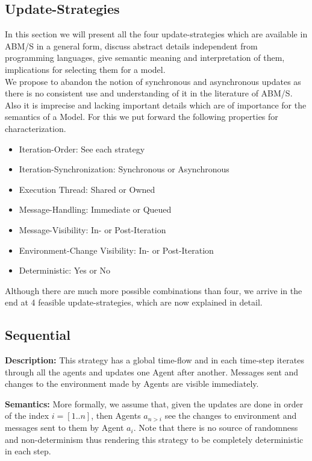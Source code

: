 \subsection{Update-Strategies}
In this section we will present all the four update-strategies which are available in ABM/S in a general form, discuss abstract details independent from programming languages, give semantic meaning and interpretation of them, implications for selecting them for a model. \\
We propose to abandon the notion of synchronous and asynchronous updates as there is no consistent use and understanding of it in the literature of ABM/S. Also it is imprecise and lacking important details which are of importance for the semantics of a Model. For this we put forward the following properties for characterization. 

\begin{itemize}
	\item Iteration-Order:				See each strategy
	\item Iteration-Synchronization: 	Synchronous or Asynchronous
	\item Execution Thread:				Shared or Owned
 	\item Message-Handling:				Immediate or Queued
 	\item Message-Visibility:			In- or Post-Iteration
 	\item Environment-Change Visibility:		In- or Post-Iteration
	\item Deterministic:				Yes or No
\end{itemize}

Although there are much more possible combinations than four, we arrive in the end at 4 feasible update-strategies, which are now explained in detail.

 	
\subsection{Sequential}
\textbf{Description:} This strategy has a global time-flow and in each time-step iterates through all the agents and updates one Agent after another. Messages sent and changes to the environment made by Agents are visible immediately. 

\textbf{Semantics:} More formally, we assume that, given the updates are done in order of the index $i = [1..n]$, then Agents $a_{n>i}$ see the changes to environment and messages sent to them by Agent $a_i$. Note that there is no source of randomness and non-determinism thus rendering this strategy to be completely deterministic in each step. 

